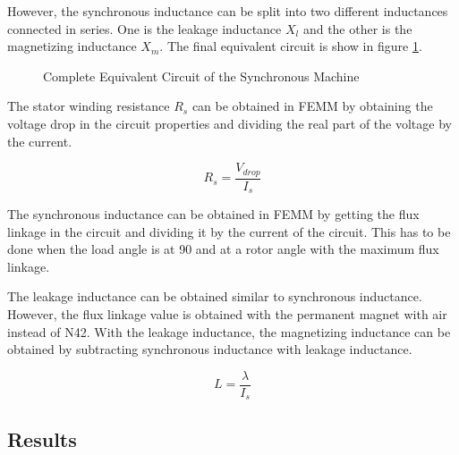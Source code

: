\documentclass[12pt]{article}
\begin{document}
However, the synchronous inductance can be split into two different inductances connected in series. One is the leakage inductance $X_{l}$ and the other is the magnetizing inductance $X_{m}$. The final equivalent circuit is show in figure \ref{fig:eq-circuit}.

\begin{figure}[H]
    \centering
    \caption{Complete Equivalent Circuit of the Synchronous Machine}
    \label{fig:eq-circuit}
\end{figure}

The stator winding resistance $R_{s}$ can be obtained in FEMM by obtaining the voltage drop in the circuit properties and dividing the real part of the voltage by the current. 

\begin{equation}
    R_s = \frac{V_{drop}}{I_{s}}
\end{equation}

The synchronous inductance can be obtained in FEMM by getting the flux linkage in the circuit and dividing it by the current of the circuit. This has to be done when the load angle is at 90 and at a rotor angle with the maximum flux linkage.

The leakage inductance can be obtained similar to synchronous inductance. However, the flux linkage value is obtained with the permanent magnet with air instead of N42. With the leakage inductance, the magnetizing inductance can be obtained by subtracting synchronous inductance with leakage inductance.

\begin{equation}
    L = \frac{\lambda}{I_{s}}
\end{equation}

\FloatBarrier

\subsection{Results}
\end{document}
